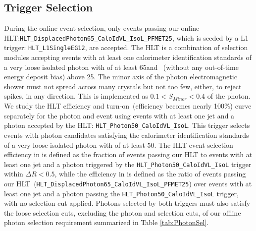 \subsection{Trigger Selection}
During the online event selection, only events passing our online HLT:\newline \texttt{HLT\_DisplacedPhoton65\_CaloIdVL\_IsoL\_PFMET25}, which is 
seeded by a L1 trigger: \texttt{HLT\_L1SingleEG12}, are accepted. The HLT is a combination of selection modules accepting events with at least one calorimeter identification standards of a very loose isolated photon with \pt of at least 65\GeVc and \ETslash\hspace{0.15cm}~(without any out-of-time energy deposit bias) above 25\GeV. The minor axis of the photon electromagnetic shower must not spread across many crystals but not too few, either, to reject spikes, in any direction. This is implemented as $ 0.1 < S_{Minor} < 0.4$ of the photon.
\newline
We study the HLT efficiency and turn-on~(efficiency becomes nearly 100\%) curve separately for the photon \pt and event \ETslash\hspace{0.15cm} using events with at least one jet and a photon accepted by the HLT: \texttt{HLT\_Photon50\_CaloIdVL\_IsoL}. This trigger selects events with photon candidates  satisfying the calorimeter identification standards of a very loose isolated photon with \pt of at least 50\GeVc.
The HLT event selection efficiency in \pt is defined as the fraction of events passing our HLT to events with at least one jet and a photon triggered by the \texttt{HLT\_Photon50\_CaloIdVL\_IsoL} trigger within $\Delta R < 0.5$, while the efficiency in \ETslash\hspace{0.15cm} is defined as the ratio of events passing our HLT~(\texttt{HLT\_DisplacedPhoton65\_CaloIdVL\_IsoL\_PFMET25}) over events with at least one jet and a photon passing  the \texttt{HLT\_Photon50\_CaloIdVL\_IsoL} trigger, with no \ETslash\hspace{0.15cm} selection cut applied.
Photons selected by both triggers must also satisfy the loose selection cuts, excluding the photon \pt  and \ETslash\hspace{0.15cm} selection cuts, of our offline photon selection requirement summarized in Table \ref{tab:PhotonSel}.


